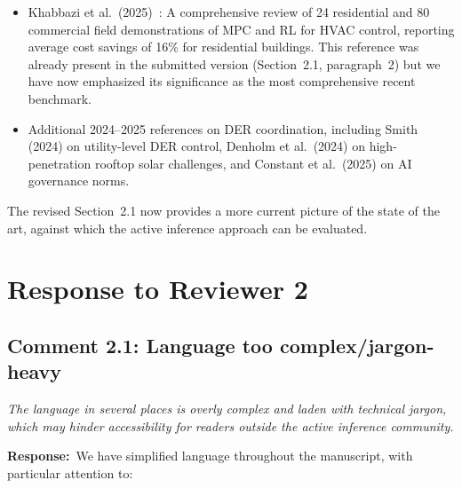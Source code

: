 \documentclass[11pt]{article}
\newcommand{\reviewercomment}[1]{\textit{#1}}
\newcommand{\response}{\textbf{Response:}\ }
\begin{document}
\begin{itemize}
    \item Khabbazi et al.\ (2025)~\cite{khabbazi2025}: A comprehensive review of 24 residential and 80 commercial field demonstrations of MPC and RL for HVAC control, reporting average cost savings of 16\% for residential buildings. This reference was already present in the submitted version (Section~2.1, paragraph~2) but we have now emphasized its significance as the most comprehensive recent benchmark.
    \item Additional 2024--2025 references on DER coordination, including Smith (2024) on utility-level DER control, Denholm et al.\ (2024) on high-penetration rooftop solar challenges, and Constant et al.\ (2025) on AI governance norms.
\end{itemize}

The revised Section~2.1 now provides a more current picture of the state of the art, against which the active inference approach can be evaluated.

\section*{Response to Reviewer 2}

\subsection*{Comment 2.1: Language too complex/jargon-heavy}

\reviewercomment{The language in several places is overly complex and laden with technical jargon, which may hinder accessibility for readers outside the active inference community.}

\response We have simplified language throughout the manuscript, with particular attention to:
\end{document}
